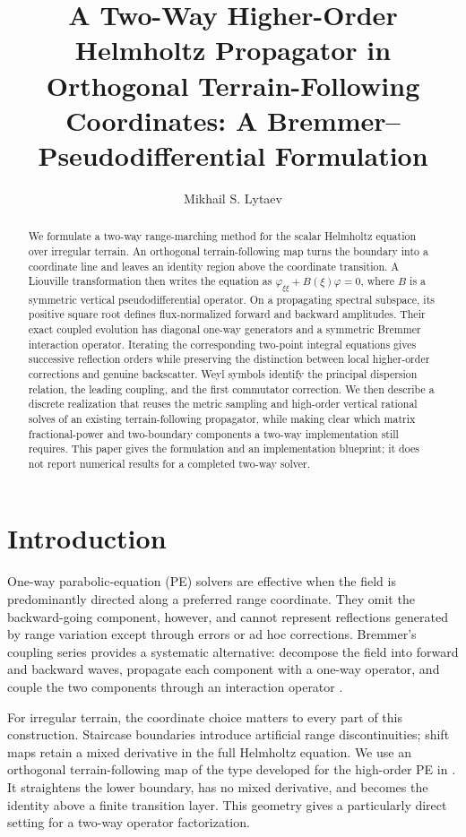 \documentclass[11pt]{article}
\title{A Two-Way Higher-Order Helmholtz Propagator in Orthogonal Terrain-Following Coordinates: A Bremmer--Pseudodifferential Formulation}
\author{Mikhail S. Lytaev}
\date{}
\begin{document}
\maketitle

\begin{abstract}
We formulate a two-way range-marching method for the scalar Helmholtz equation
over irregular terrain. An orthogonal terrain-following map turns the boundary
into a coordinate line and leaves an identity region above the coordinate
transition. A Liouville transformation then writes the equation as
$\varphi_{\xi\xi}+B(\xi)\varphi=0$, where $B$ is a symmetric vertical
pseudodifferential operator. On a propagating spectral subspace, its positive
square root defines flux-normalized forward and backward amplitudes. Their
exact coupled evolution has diagonal one-way generators and a symmetric
Bremmer interaction operator. Iterating the corresponding two-point integral
equations gives successive reflection orders while preserving the distinction
between local higher-order corrections and genuine backscatter. Weyl symbols
identify the principal dispersion relation, the leading coupling, and the
first commutator correction. We then describe a discrete realization that
reuses the metric sampling and high-order vertical rational solves of an
existing terrain-following propagator, while making clear which matrix
fractional-power and two-boundary components a two-way implementation still
requires. This paper gives the formulation and an implementation blueprint;
it does not report numerical results for a completed two-way solver.
\end{abstract}

\section{Introduction}

One-way parabolic-equation (PE) solvers are effective when the field is
predominantly directed along a preferred range coordinate. They omit the
backward-going component, however, and cannot represent reflections generated
by range variation except through errors or ad hoc corrections. Bremmer's
coupling series provides a systematic alternative: decompose the field into
forward and backward waves, propagate each component with a one-way operator,
and couple the two components through an interaction operator
\cite{bremmer,dehoop,gautesen}.

For irregular terrain, the coordinate choice matters to every part of this
construction. Staircase boundaries introduce artificial range discontinuities;
shift maps retain a mixed derivative in the full Helmholtz equation. We use an
orthogonal terrain-following map of the type developed for the high-order PE
in \cite{lytaev_tf}. It straightens the lower boundary, has no mixed
derivative, and becomes the identity above a finite transition layer. This
geometry gives a particularly direct setting for a two-way operator
factorization.
\end{document}
